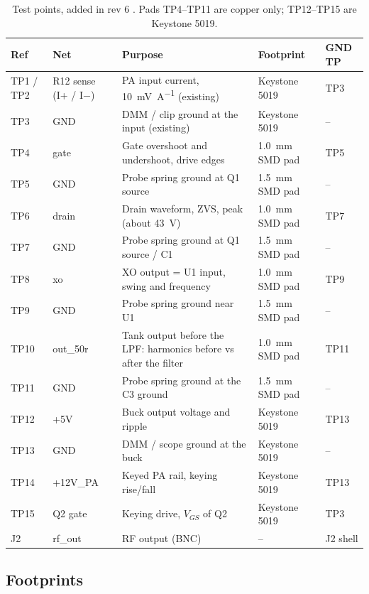 \documentclass[11pt,letterpaper]{article}
\begin{document}
\begin{table}[H]
\centering\small
\caption{Test points, added in rev 6 \cite{projkicad}. Pads TP4--TP11 are copper only; TP12--TP15 are Keystone 5019.}\label{tab:tp}
\begin{tabularx}{\textwidth}{@{}lL{1.9cm}YL{3.2cm}l@{}}
\toprule
Ref & Net & Purpose & Footprint & GND TP \\ \midrule
TP1 / TP2 & R12 sense (I+ / I$-$) & PA input current, \SI{10}{\milli\volt\per\ampere} (existing) & Keystone 5019 & TP3 \\
TP3 & GND & DMM / clip ground at the input (existing) & Keystone 5019 & -- \\
TP4 & gate & Gate overshoot and undershoot, drive edges & \SI{1.0}{\milli\meter} SMD pad & TP5 \\
TP5 & GND & Probe spring ground at Q1 source & \SI{1.5}{\milli\meter} SMD pad & -- \\
TP6 & drain & Drain waveform, ZVS, peak (about \SI{43}{\volt}) & \SI{1.0}{\milli\meter} SMD pad & TP7 \\
TP7 & GND & Probe spring ground at Q1 source / C1 & \SI{1.5}{\milli\meter} SMD pad & -- \\
TP8 & xo & XO output = U1 input, swing and frequency & \SI{1.0}{\milli\meter} SMD pad & TP9 \\
TP9 & GND & Probe spring ground near U1 & \SI{1.5}{\milli\meter} SMD pad & -- \\
TP10 & out\_50r & Tank output before the LPF: harmonics before vs after the filter & \SI{1.0}{\milli\meter} SMD pad & TP11 \\
TP11 & GND & Probe spring ground at the C3 ground & \SI{1.5}{\milli\meter} SMD pad & -- \\
TP12 & +5V & Buck output voltage and ripple & Keystone 5019 & TP13 \\
TP13 & GND & DMM / scope ground at the buck & Keystone 5019 & -- \\
TP14 & +12V\_PA & Keyed PA rail, keying rise/fall & Keystone 5019 & TP13 \\
TP15 & Q2 gate & Keying drive, $V_{GS}$ of Q2 & Keystone 5019 & TP3 \\
J2 & rf\_out & RF output (BNC) & -- & J2 shell \\
\bottomrule
\end{tabularx}
\end{table}

\subsection{Footprints}\label{sec:footprints}
\end{document}

